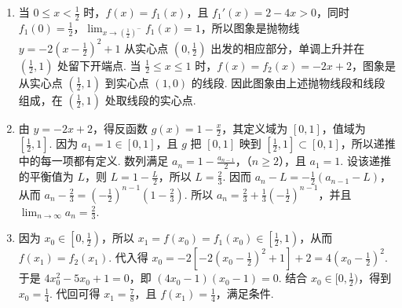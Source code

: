 \begin{solution}
\begin{enumerate}
\item 当 \(0\leq x<\frac{1}{2}\) 时，\(f(x)=f_{1}(x)\)，且 \(f_{1}'(x)=2-4x>0\)，同时 \(f_{1}(0)=\frac{1}{2}\)，\(\lim_{x\to(\frac{1}{2})^{-}}f_{1}(x)=1\)，所以图象是抛物线 \(y=-2\left(x-\frac{1}{2}\right)^{2}+1\) 从实心点 \(\left(0,\frac{1}{2}\right)\) 出发的相应部分，单调上升并在 \(\left(\frac{1}{2},1\right)\) 处留下开端点. 当 \(\frac{1}{2}\leq x\leq1\) 时，\(f(x)=f_{2}(x)=-2x+2\)，图象是从实心点 \(\left(\frac{1}{2},1\right)\) 到实心点 \((1,0)\) 的线段. 因此图象由上述抛物线段和线段组成，在 \(\left(\frac{1}{2},1\right)\) 处取线段的实心点.

\item 由 \(y=-2x+2\)，得反函数 \(g(x)=1-\frac{x}{2}\)，其定义域为 \([0,1]\)，值域为 \([\frac{1}{2},1]\). 因为 \(a_{1}=1\in[0,1]\)，且 \(g\) 把 \([0,1]\) 映到 \([\frac{1}{2},1]\subset[0,1]\)，所以递推中的每一项都有定义. 数列满足 \(a_n=1-\frac{a_{n-1}}{2}\)，（\(n\geq2\)），且 \(a_1=1\). 设该递推的平衡值为 \(L\)，则 \(L=1-\frac{L}{2}\)，所以 \(L=\frac{2}{3}\). 因而 \(a_n-L=-\frac{1}{2}(a_{n-1}-L)\)，从而 \(a_n-\frac{2}{3}=\left(-\frac{1}{2}\right)^{n-1}\left(1-\frac{2}{3}\right)\). 所以 \(a_n=\frac{2}{3}+\frac{1}{3}\left(-\frac{1}{2}\right)^{n-1}\)，并且 \(\displaystyle\lim_{n\to\infty}a_n=\frac{2}{3}\).

\item 因为 \(x_0\in\left[0,\frac{1}{2}\right)\)，所以 \(x_1=f(x_0)=f_1(x_0)\in\left[\frac{1}{2},1\right)\)，从而 \(f(x_1)=f_2(x_1)\). 代入得 \(x_0=-2\left[-2\left(x_0-\frac{1}{2}\right)^2+1\right]+2=4\left(x_0-\frac{1}{2}\right)^2\).
于是 \(4x_0^2-5x_0+1=0\)，即 \((4x_0-1)(x_0-1)=0\). 结合 \(x_0\in[0,\frac{1}{2})\)，得到 \(x_0=\frac{1}{4}\). 代回可得 \(x_1=\frac{7}{8}\)，且 \(f(x_1)=\frac{1}{4}\)，满足条件.
\end{enumerate}
\end{solution}
